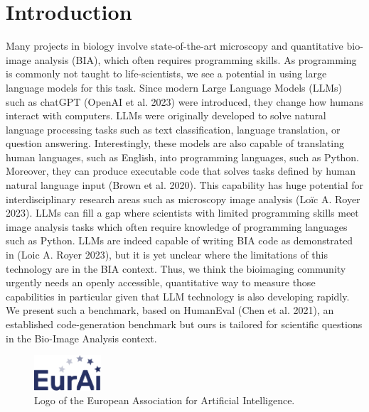 \documentclass{ecai}
\begin{document}

\section{Introduction}

Many projects in biology involve state-of-the-art microscopy and  quantitative bio-image analysis (BIA), which often requires programming skills. As programming is commonly not taught to life-scientists, we see a potential in using large language models for this task. Since modern Large Language Models (LLMs) such as chatGPT (OpenAI et al. 2023) were introduced, they change how humans interact with computers. LLMs were originally developed to solve  natural language processing tasks such as  text classification, language translation, or question answering. Interestingly, these models  are also capable of translating human languages, such as English, into programming languages, such as Python. Moreover, they can produce executable code that solves tasks defined by human natural language input (Brown et al. 2020). This capability has huge potential for interdisciplinary research areas such as microscopy image analysis (Loïc A. Royer 2023). LLMs can fill a gap where scientists with limited programming skills meet image analysis tasks which often require knowledge of programming languages such as Python. LLMs are indeed capable of writing BIA code as demonstrated in (Loic A. Royer 2023), but it is yet unclear where the limitations of this technology are in the BIA context. Thus, we think the bioimaging community urgently needs an openly accessible, quantitative way to measure those capabilities in particular given that LLM technology is also developing rapidly. We present such a benchmark, based on HumanEval (Chen et al. 2021), an established code-generation benchmark but ours is tailored for scientific questions in the Bio-Image Analysis context.

\begin{figure}[h]
\centering
\includegraphics[width=2.5cm]{eurai}
\caption{Logo of the European Association for Artificial Intelligence.}
\label{fig:eurai}
\end{figure}

\end{document}
